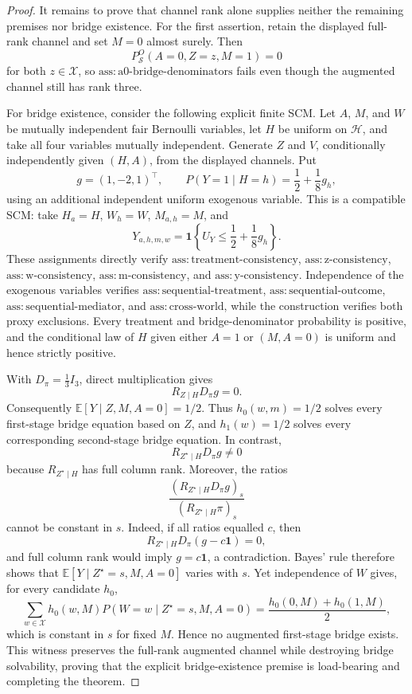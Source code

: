 \documentclass{article}
\begin{document}
\begin{proof}
It remains to prove that channel rank alone supplies neither the remaining premises nor bridge existence. For the first assertion, retain the displayed full-rank channel and set \(M=0\) almost surely. Then
\[
 P_{\mathcal S}^O(A=0,Z=z,M=1)=0
\]
for both \(z\in\mathcal X\), so \(\mathrm{ass{:}a0\text{-}bridge\text{-}denominators}\) fails even though the augmented channel still has rank three.

For bridge existence, consider the following explicit finite SCM. Let \(A\), \(M\), and \(W\) be mutually independent fair Bernoulli variables, let \(H\) be uniform on \(\mathcal H\), and take all four variables mutually independent. Generate \(Z\) and \(V\), conditionally independently given \((H,A)\), from the displayed channels. Put
\[
 g=(1,-2,1)^{\top},
 \qquad
 P(Y=1\mid H=h)=\frac12+\frac18g_h,
\]
using an additional independent uniform exogenous variable. This is a compatible SCM: take \(H_a=H\), \(W_h=W\), \(M_{a,h}=M\), and
\[
 Y_{a,h,m,w}=\mathbf 1\!\left\{U_Y\le\frac12+\frac18g_h\right\}.
\]
These assignments directly verify \(\mathrm{ass{:}treatment\text{-}consistency}\), \(\mathrm{ass{:}z\text{-}consistency}\), \(\mathrm{ass{:}w\text{-}consistency}\), \(\mathrm{ass{:}m\text{-}consistency}\), and \(\mathrm{ass{:}y\text{-}consistency}\). Independence of the exogenous variables verifies \(\mathrm{ass{:}sequential\text{-}treatment}\), \(\mathrm{ass{:}sequential\text{-}outcome}\), \(\mathrm{ass{:}sequential\text{-}mediator}\), and \(\mathrm{ass{:}cross\text{-}world}\), while the construction verifies both proxy exclusions. Every treatment and bridge-denominator probability is positive, and the conditional law of \(H\) given either \(A=1\) or \((M,A=0)\) is uniform and hence strictly positive.

With \(D_\pi=\frac13I_3\), direct multiplication gives
\[
 R_{Z\mid H}D_\pi g=0.
\]
Consequently \(\mathbb E[Y\mid Z,M,A=0]=1/2\). Thus \(h_0(w,m)=1/2\) solves every first-stage bridge equation based on \(Z\), and \(h_1(w)=1/2\) solves every corresponding second-stage bridge equation. In contrast,
\[
 R_{Z^{\star}\mid H}D_\pi g\ne0
\]
because \(R_{Z^{\star}\mid H}\) has full column rank. Moreover, the ratios
\[
 \frac{(R_{Z^{\star}\mid H}D_\pi g)_s}
 {(R_{Z^{\star}\mid H}\pi)_s}
\]
cannot be constant in \(s\). Indeed, if all ratios equalled \(c\), then
\[
 R_{Z^{\star}\mid H}D_\pi(g-c\mathbf 1)=0,
\]
and full column rank would imply \(g=c\mathbf 1\), a contradiction. Bayes' rule therefore shows that \(\mathbb E[Y\mid Z^{\star}=s,M,A=0]\) varies with \(s\). Yet independence of \(W\) gives, for every candidate \(h_0\),
\[
 \sum_{w\in\mathcal X}h_0(w,M)P(W=w\mid Z^{\star}=s,M,A=0)
 =\frac{h_0(0,M)+h_0(1,M)}{2},
\]
which is constant in \(s\) for fixed \(M\). Hence no augmented first-stage bridge exists. This witness preserves the full-rank augmented channel while destroying bridge solvability, proving that the explicit bridge-existence premise is load-bearing and completing the theorem.
\end{proof}
\end{document}
